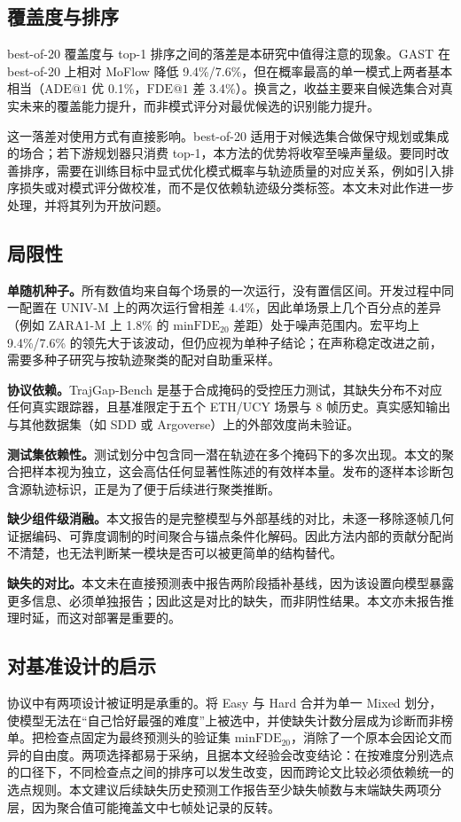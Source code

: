 \subsection{覆盖度与排序}

best-of-20 覆盖度与 top-1 排序之间的落差是本研究中值得注意的现象。GAST 在 best-of-20 上相对 MoFlow 降低 9.4\%/7.6\%，但在概率最高的单一模式上两者基本相当（$\mathrm{ADE@1}$ 优 0.1\%，$\mathrm{FDE@1}$ 差 3.4\%）。换言之，收益主要来自候选集合对真实未来的覆盖能力提升，而非模式评分对最优候选的识别能力提升。

这一落差对使用方式有直接影响。best-of-20 适用于对候选集合做保守规划或集成的场合；若下游规划器只消费 top-1，本方法的优势将收窄至噪声量级。要同时改善排序，需要在训练目标中显式优化模式概率与轨迹质量的对应关系，例如引入排序损失或对模式评分做校准，而不是仅依赖轨迹级分类标签。本文未对此作进一步处理，并将其列为开放问题。

\subsection{局限性}

\textbf{单随机种子。}所有数值均来自每个场景的一次运行，没有置信区间。开发过程中同一配置在 UNIV-M 上的两次运行曾相差 4.4\%，因此单场景上几个百分点的差异（例如 ZARA1-M 上 1.8\% 的 $\mathrm{minFDE}_{20}$ 差距）处于噪声范围内。宏平均上 9.4\%/7.6\% 的领先大于该波动，但仍应视为单种子结论；在声称稳定改进之前，需要多种子研究与按轨迹聚类的配对自助重采样。

\textbf{协议依赖。}TrajGap-Bench 是基于合成掩码的受控压力测试，其缺失分布不对应任何真实跟踪器，且基准限定于五个 ETH/UCY 场景与 8 帧历史。真实感知输出与其他数据集（如 SDD 或 Argoverse）上的外部效度尚未验证。

\textbf{测试集依赖性。}测试划分中包含同一潜在轨迹在多个掩码下的多次出现。本文的聚合把样本视为独立，这会高估任何显著性陈述的有效样本量。发布的逐样本诊断包含源轨迹标识，正是为了便于后续进行聚类推断。

\textbf{缺少组件级消融。}本文报告的是完整模型与外部基线的对比，未逐一移除逐帧几何证据编码、可靠度调制的时间聚合与锚点条件化解码。因此方法内部的贡献分配尚不清楚，也无法判断某一模块是否可以被更简单的结构替代。

\textbf{缺失的对比。}本文未在直接预测表中报告两阶段插补基线，因为该设置向模型暴露更多信息、必须单独报告；因此这是对比的缺失，而非阴性结果。本文亦未报告推理时延，而这对部署是重要的。

\subsection{对基准设计的启示}

协议中有两项设计被证明是承重的。将 Easy 与 Hard 合并为单一 Mixed 划分，使模型无法在“自己恰好最强的难度”上被选中，并使缺失计数分层成为诊断而非榜单。把检查点固定为最终预测头的验证集 $\mathrm{minFDE}_{20}$，消除了一个原本会因论文而异的自由度。两项选择都易于采纳，且据本文经验会改变结论：在按难度分别选点的口径下，不同检查点之间的排序可以发生改变，因而跨论文比较必须依赖统一的选点规则。本文建议后续缺失历史预测工作报告至少缺失帧数与末端缺失两项分层，因为聚合值可能掩盖文中七帧处记录的反转。
